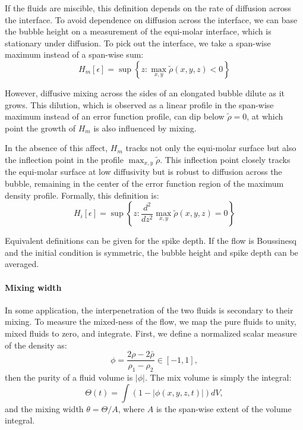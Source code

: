 If the fluids are miscible, this definition depends on the rate of diffusion across the interface.
To avoid dependence on diffusion across the interface, we can base the bubble height on a measurement of the equi-molar interface, which is stationary under diffusion.
To pick out the interface, we take a span-wise maximum instead of a span-wise sum:
\begin{equation}
H_m[\epsilon] = \sup \left\{z : \max_{x,y} \tilde\rho(x,y,z) < 0 \right\}
\end{equation}

However, diffusive mixing across the sides of an elongated bubble dilute as it grows.
This dilution, which is observed as a linear profile in the span-wise maximum instead of an error function profile, can dip below $\tilde\rho = 0$, at which point the growth of $H_m$ is also influenced by mixing.

In the absence of this affect, $H_{m}$ tracks not only the equi-molar surface but also the inflection point in the profile $\max_{x,y} \tilde \rho$.
This inflection point closely tracks the equi-molar surface at low diffusivity but is robust to diffusion across the bubble, remaining in the center of the error function region of the maximum density profile.
Formally, this definition is:
\begin{equation}
H_i[\epsilon] = \sup \left\{z : \frac{d^2}{dz^2} \max_{x,y} \tilde\rho(x,y,z) = 0 \right\}
\end{equation}

Equivalent definitions can be given for the spike depth.
If the flow is Boussinesq and the initial condition is symmetric, the bubble height and spike depth can be averaged.

\paragraph{Mixing width}

In some application, the interpenetration of the two fluids is secondary to their mixing.
To measure the mixed-ness of the flow, we map the pure fluids to unity, mixed fluids to zero, and integrate.
First, we define a normalized scalar measure of the density as:
\begin{equation}
\phi = \frac{2\rho - 2\bar\rho}{\rho_1 - \rho_2} \in \left[-1,1\right],
\end{equation}
then the purity of a fluid volume is $|\phi|$.
The mix volume is simply the integral:
\begin{equation}
\Theta(t) = \int \left(1 - \left|\phi(x,y,z,t)\right|\right) dV,
\end{equation}
and the mixing width $\theta = \Theta / A$, where $A$ is the span-wise extent of the volume integral.

